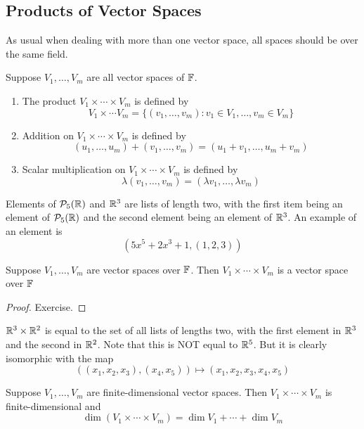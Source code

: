 \subsection*{Products of Vector Spaces}
As usual when dealing with more than one vector space, all spaces should be over the same field.
\begin{definition}
    Suppose $V_1, \dots, V_m$ are all vector spaces of $\mathbb F$.
    \begin{enumerate}
        \item The product $V_1\times \cdots \times V_m$ is defined by
        \[ V_1\times \cdots V_m = \{ (v_1, \dots, v_m) : v_1 \in V_1, \dots, v_m\in V_m\} \]
        \item Addition on $V_1\times \cdots\times V_m$ is defined by
        \[ (u_1, \dots, u_m) + (v_1, \dots, v_m) = (u_1 + v_1, \dots, u_m + v_m) \]
        \item Scalar multiplication on $V_1\times \cdots\times V_m$ is defined by
        \[ \lambda(v_1, \dots, v_m) = (\lambda v_1, \dots, \lambda v_m) \]
    \end{enumerate}
\end{definition}
\begin{example}
    Elements of $\mathcal{P}_5(\mathbb{R})$ and $\mathbb{R}^3$ are lists of length two, with the first item being an element of $\mathcal{P}_5(\mathbb{R})$ and the second element being an element of $\mathbb{R}^3$. An example of an element is
    \[ (5x^5 + 2x^3 + 1, (1,2,3))\]
\end{example}
\begin{theorem}
    Suppose $V_1, \dots, V_m$ are vector spaces over $\mathbb F$. Then $V_1\times\cdots\times V_m$ is a vector space over $\mathbb F$
\end{theorem}
\begin{proof}
    Exercise.
\end{proof}
\begin{example}
    $\mathbb{R}^3\times \mathbb{R}^2$ is equal to the set of all lists of lengths two, with the first element in $\mathbb{R}^3$ and the second in $\mathbb{R}^2$. Note that this is NOT equal to $\mathbb{R}^5$. But it is clearly isomorphic with the map 
    \[ ((x_1, x_2, x_3), (x_4, x_5)) \mapsto (x_1, x_2, x_3, x_4, x_5) \]
\end{example}
\begin{theorem}
    Suppose $V_1, \dots, V_m$ are finite-dimensional vector spaces. Then $V_1\times \cdots\times V_m$ is finite-dimensional and
    \[ \dim(V_1\times\cdots\times V_m) = \dim V_1 + \cdots + \dim V_m\]
\end{theorem}
